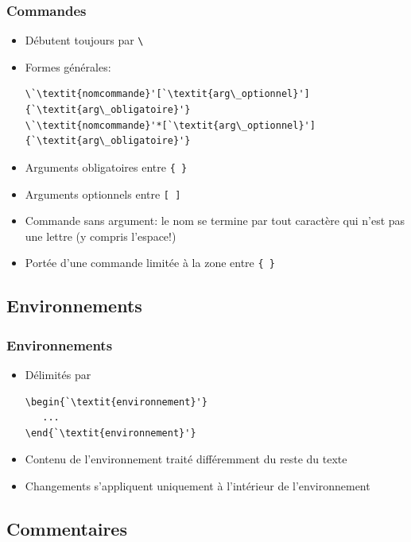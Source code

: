 \begin{frame}[fragile=singleslide]
  \frametitle{Commandes}
  \begin{itemize}
  \item Débutent toujours par \verb=\=
  \item Formes générales:
\begin{lstlisting}
\`\textit{nomcommande}'[`\textit{arg\_optionnel}']{`\textit{arg\_obligatoire}'}
\`\textit{nomcommande}'*[`\textit{arg\_optionnel}']{`\textit{arg\_obligatoire}'}
\end{lstlisting}
  \item Arguments obligatoires entre \verb={ }=
  \item Arguments optionnels entre \verb=[ ]=
  \item Commande sans argument: le nom se termine par tout
    caractère qui n'est pas une lettre (y compris l'espace!)
  \item Portée d'une commande limitée à la zone entre \verb={ }=
  \end{itemize}
\end{frame}

\subsection{Environnements}

\begin{frame}[fragile=singleslide]
  \frametitle{Environnements}
  \begin{itemize}
  \item Délimités par
\begin{lstlisting}
\begin{`\textit{environnement}'}
   ...
\end{`\textit{environnement}'}
    \end{lstlisting}
  \item Contenu de l'environnement traité différemment du reste du texte
  \item Changements s'appliquent uniquement à l'intérieur de
    l'environnement
  \end{itemize}
\end{frame}

\subsection{Commentaires}

